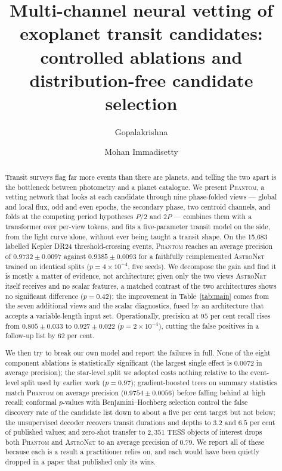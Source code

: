 \documentclass[preprint,12pt,authoryear]{elsarticle}
\newcommand{\phantomnet}{\textsc{Phantom}}
\newcommand{\astronet}{\textsc{AstroNet}}
\begin{document}
\begin{frontmatter}

\title{Multi-channel neural vetting of exoplanet transit candidates:
       controlled ablations and distribution-free candidate selection}

\author[a]{Gopalakrishna}
\author[a]{Mohan Immadisetty}
\address[a]{DEPARTMENT, INSTITUTION, CITY, COUNTRY}

\begin{abstract}
Transit surveys flag far more events than there are planets, and telling the two
apart is the bottleneck between photometry and a planet catalogue. We present
\phantomnet{}, a vetting network that looks at each candidate through nine
phase-folded views --- global and local flux, odd and even epochs, the secondary
phase, two centroid channels, and folds at the competing period hypotheses
$P/2$ and $2P$ --- combines them with a transformer over per-view tokens, and
fits a five-parameter transit model on the side, from the light curve alone,
without ever being taught a transit shape. On the 15{,}683 labelled Kepler DR24
threshold-crossing events, \phantomnet{} reaches an average precision of
$0.9732 \pm 0.0097$ against $0.9385 \pm 0.0093$ for a faithfully reimplemented
\astronet{} trained on identical splits ($p = 4\times10^{-4}$, five seeds). We
decompose the gain and find it is mostly a matter of evidence, not architecture:
given only the two views \astronet{} itself receives and no scalar features,
a matched contrast of the two architectures shows no significant difference
($p = 0.42$); the improvement in Table~\ref{tab:main} comes from the seven
additional views and the scalar diagnostics, fused by an architecture that
accepts a variable-length input set. Operationally, precision at $95$ per cent recall
rises from $0.805 \pm 0.033$ to $0.927 \pm 0.022$ ($p = 2\times10^{-4}$),
cutting the false positives in a follow-up list by $62$ per cent.

We then try to break our own model and report the failures in full. None of the
eight component ablations is statistically significant (the largest single effect
is $0.0072$ in average precision); the star-level split we adopted costs nothing
relative to the event-level split used by earlier work ($p = 0.97$);
gradient-boosted trees on summary statistics match \phantomnet{} on average
precision ($0.9754 \pm 0.0056$) before falling behind at high recall; conformal
$p$-values with Benjamini--Hochberg selection control the false discovery rate of
the candidate list down to about a five per cent target but not below; the
unsupervised decoder recovers transit durations and depths to $3.2$ and $6.5$ per
cent of published values; and zero-shot transfer to $2{,}351$ TESS objects of
interest drops both \phantomnet{} and \astronet{} to an average precision of
$0.79$. We report all of these because each is a result a practitioner relies on,
and each would have been quietly dropped in a paper that published only its wins.
\end{abstract}


\end{frontmatter}
\end{document}
